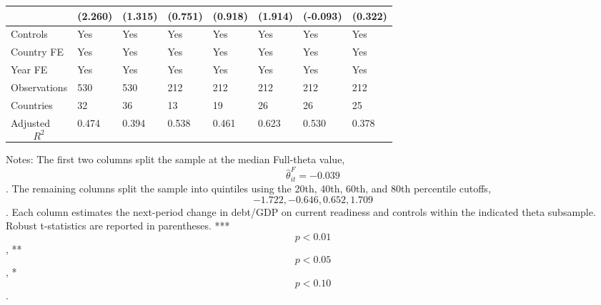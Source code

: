 \begin{table}[H]
\begin{threeparttable}
\begin{tabularx}{\textwidth}{lYYYYYYY}
  & (2.260) & (1.315) & (0.751) & (0.918) & (1.914) & (-0.093) & (0.322) \\
\midrule
Controls & Yes & Yes & Yes & Yes & Yes & Yes & Yes \\
Country FE & Yes & Yes & Yes & Yes & Yes & Yes & Yes \\
Year FE & Yes & Yes & Yes & Yes & Yes & Yes & Yes \\
Observations & 530 & 530 & 212 & 212 & 212 & 212 & 212 \\
Countries & 32 & 36 & 13 & 19 & 26 & 26 & 25 \\
Adjusted $$R^2$$ & 0.474 & 0.394 & 0.538 & 0.461 & 0.623 & 0.530 & 0.378 \\
\bottomrule
\end{tabularx}
\begin{tablenotes}[flushleft]\footnotesize
\item Notes: The first two columns split the sample at the median Full-theta value, $$\widehat{\theta}^{F}_{it}=-0.039$$. The remaining columns split the sample into quintiles using the 20th, 40th, 60th, and 80th percentile cutoffs, $$-1.722, -0.646, 0.652, 1.709$$. Each column estimates the next-period change in debt/GDP on current readiness and controls within the indicated theta subsample. Robust t-statistics are reported in parentheses. *** $$p<0.01$$, ** $$p<0.05$$, * $$p<0.10$$.
\end{tablenotes}
\end{threeparttable}
\end{table}

